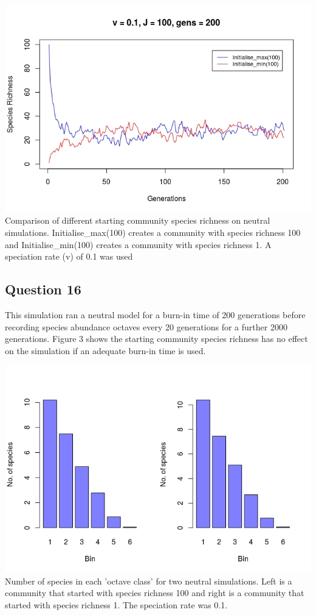 \documentclass{article}
\begin{document}
\begin{center}
  \includegraphics[width=\textwidth]{../Results/question_12.jpeg}
   {Comparison of different starting community species
  richness on neutral simulations. Initialise\_max(100) creates a community with
  species richness 100 and Initialise\_min(100) creates a community with species
  richness 1. A speciation rate (v) of 0.1 was used}
\end{center}

\break

\subsection*{Question 16}
This simulation ran a neutral model for a burn-in time of 
200 generations before recording species abundance octaves
every 20 generations for a further 2000 generations. Figure 
3 shows the starting community species richness has no effect
on the simulation if an adequate burn-in time is used.

\begin{center}
  \includegraphics[width=\textwidth]{../Results/question_16.jpeg}
   {Number of species in each 'octave class' for two neutral
  simulations. Left is a community that started with species richness 100 and right
  is a community that started with species richness 1. The speciation rate was 0.1.}
\end{center}
\end{document}
